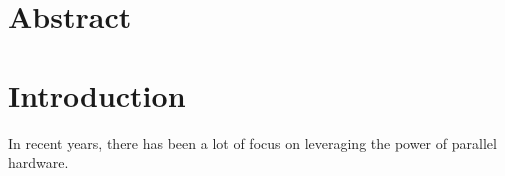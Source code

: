 \documentclass[11pt]{article}
\begin{document}

\clearpage\maketitle
\thispagestyle{empty}

\newpage

\section{Abstract}

\section{Introduction}
In recent years, there has been a lot of focus on leveraging the power of parallel hardware. 
\end{document}
